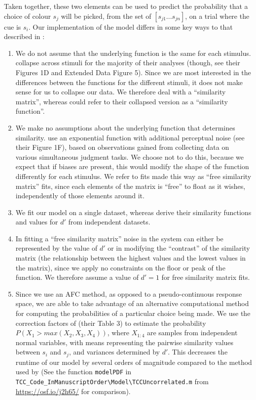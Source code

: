 Taken together, these two elements can be used to predict the probability that a choice of colour $s_j$ will be picked, from the set of $[s_{j1} ... s_{jn}]$, on a trial where the cue is $s_i$.
Our implementation of the model differs in some key ways to that described in \cite{schurgin_psychophysical_2020}:
\begin{enumerate}
\item We do not assume that the underlying function is the same for each stimulus. 
\cite{schurgin_psychophysical_2020} collapse across stimuli for the majority of their analyses (though, see their Figures 1D and Extended Data Figure 5). 
Since we are most interested in the differences between the functions for the different stimuli, it does not make sense for us to collapse our data. 
We therefore deal with a ``similarity matrix'', whereas \cite{schurgin_psychophysical_2020} could refer to their collapsed version as a ``similarity function''.
\item We make no assumptions about the underlying function that determines similarity. \cite{schurgin_psychophysical_2020} use an exponential function with additional perceptual noise (see their Figure 1F), based on observations gained from collecting data on various simultaneous judgment tasks. We choose not to do this, because we expect that if biases are present, this would modify the shape of the function differently for each stimulus. We refer to fits made this way as ``free similarity matrix'' fits, since each elements of the matrix is ``free'' to float as it wishes, independently of those elements around it.
\item We fit our model on a single dataset, whereas \cite{schurgin_psychophysical_2020} derive their similarity functions and values for $d'$ from independent datasets. %
\item In fitting a ``free similarity matrix'' noise in the system can either be represented by the value of $d'$ or in modifying the ``contrast'' of the similarity matrix (the relationship between the highest values and the lowest values in the matrix), since we apply no constraints on the floor or peak of the function. 
We therefore assume a value of $d' = 1$ for free similarity matrix fits. %
\item Since we use an AFC method, as opposed to a pseudo-continuous response space, we are able to take advantage of an alternative computational method for computing the probabilities of a particular choice being made.
We use the correction factors of \cite{mcgraw_common_1992} (their Table 3) to estimate the probability $P(X_1>max(X_2,X_3,X_4))$, where $X_{1:4}$ are samples from independent normal variables, with means representing the pairwise similarity values between $s_i$ and $s_j$, and variances determined by $d'$.
This decreases the runtime of our model by several orders of magnitude compared to the method used by \cite{schurgin_psychophysical_2020} (See the function \lstinline{modelPDF} in \lstinline{TCC_Code_InManuscriptOrder\Model\TCCUncorrelated.m} from \url{https://osf.io/j2h65/} for comparison).
\end{enumerate}

